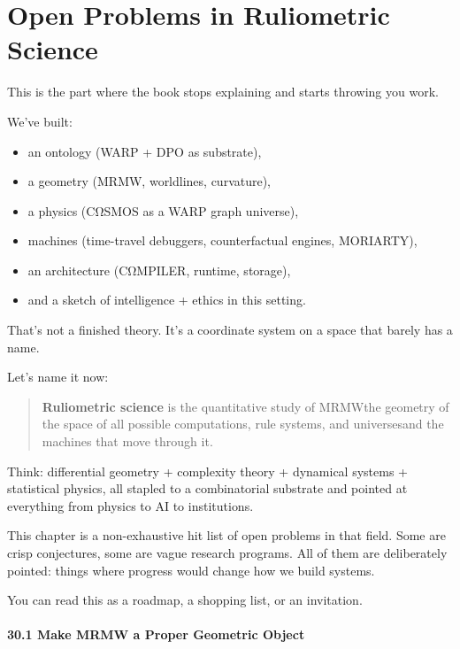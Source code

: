 \chapter{Open Problems in Ruliometric Science}
\label{sec:open-problems-ruliometric}

This is the part where the book stops explaining and starts throwing you work.

We’ve built:

\begin{itemize}
  \item an ontology (WARP + DPO as substrate),
  \item a geometry (MRMW, worldlines, curvature),
  \item a physics (CΩSMOS as a WARP graph universe),
  \item machines (time-travel debuggers, counterfactual engines, MORIARTY),
  \item an architecture (CΩMPILER, runtime, storage),
  \item and a sketch of intelligence + ethics in this setting.
\end{itemize}

That’s not a finished theory. It’s a coordinate system on a space that barely has a name.

Let’s name it now:

\begin{quote}
\textbf{Ruliometric science} is the quantitative study of MRMW\emd{}the geometry of the space of all possible computations, rule systems, and universes\emd{}and the machines that move through it.
\end{quote}

Think: differential geometry + complexity theory + dynamical systems + statistical physics, all stapled to a combinatorial substrate and pointed at everything from physics to AI to institutions.

This chapter is a non-exhaustive hit list of open problems in that field.
Some are crisp conjectures, some are vague research programs. All of them are
deliberately pointed: things where progress would change how we build systems.

You can read this as a roadmap, a shopping list, or an invitation.

\subsubsection*{30.1  Make MRMW a Proper Geometric Object}

